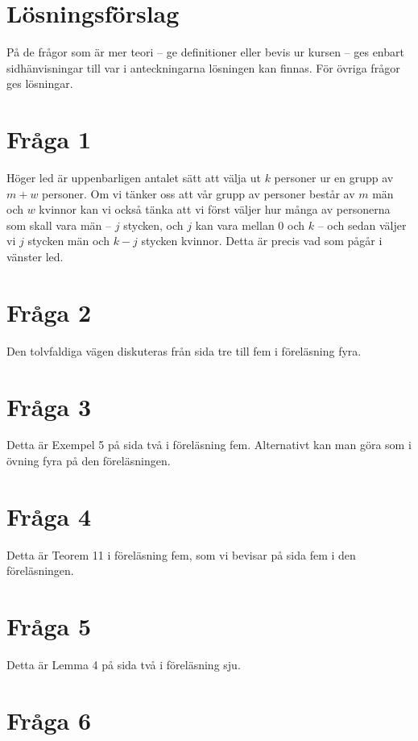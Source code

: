 \documentclass[nobib]{tufte-handout}
\begin{document}
\pagebreak

\section{Lösningsförslag}

På de frågor som är mer teori -- ge definitioner eller bevis ur kursen -- ges enbart sidhänvisningar till var i anteckningarna lösningen kan finnas. För övriga frågor ges lösningar.

\section{Fråga 1}

Höger led är uppenbarligen antalet sätt att välja ut $k$ personer ur en grupp av $m + w$ personer. Om vi tänker oss att vår grupp av personer består av $m$ män och $w$ kvinnor kan vi också tänka att vi först väljer hur många av personerna som skall vara män -- $j$ stycken, och $j$ kan vara mellan $0$ och $k$ -- och sedan väljer vi $j$ stycken män och $k-j$ stycken kvinnor. Detta är precis vad som pågår i vänster led.

\section{Fråga 2}

Den tolvfaldiga vägen diskuteras från sida tre till fem i föreläsning fyra.

\section{Fråga 3}

Detta är Exempel 5 på sida två i föreläsning fem. Alternativt kan man göra som i övning fyra på den föreläsningen.

\section{Fråga 4}

Detta är Teorem 11 i föreläsning fem, som vi bevisar på sida fem i den föreläsningen.

\section{Fråga 5}

Detta är Lemma 4 på sida två i föreläsning sju.

\section{Fråga 6}
\end{document}
